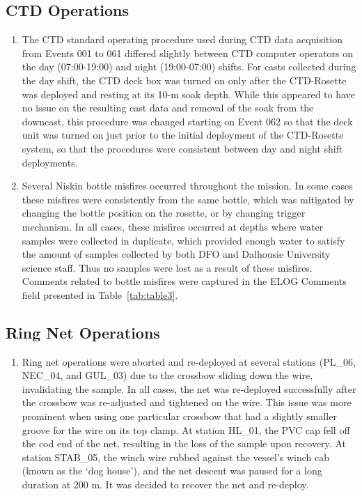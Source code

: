 \documentclass[12pt]{article}\usepackage[]{graphicx}\usepackage[]{color}
\begin{document}
\subsection{CTD Operations}\label{ctd-operations-1}
\begin{enumerate}
\def\labelenumi{\arabic{enumi}.}
\item
  The CTD standard operating procedure used during CTD data acquisition from Events 001 to 061 differed slightly between CTD computer operators on the day (07:00-19:00) and night (19:00-07:00) shifts. For casts collected during the day shift, the CTD deck box was turned on only after the CTD-Rosette was deployed and resting at its 10-m soak depth. While this appeared to have no issue on the resulting cast data and removal of the soak from the downcast, this procedure was changed starting on Event 062 so that the deck unit was turned on just prior to the initial deployment of the CTD-Rosette system, so that the procedures were consistent between day and night shift deployments.
\item
  Several Niskin bottle misfires occurred throughout the mission. In some cases these misfires were consistently from the same bottle, which was mitigated by changing the bottle position on the rosette, or by changing trigger mechanism. In all cases, these misfires occurred at depths where water samples were collected in duplicate, which provided enough water to satisfy the amount of samples collected by both DFO and Dalhousie University science staff. Thus no samples were lost as a result of these misfires. Comments related to bottle misfires were captured in the ELOG Comments field presented in Table~\ref{tab:table3}.
\end{enumerate}
\subsection{Ring Net Operations}\label{ring-net-operations}
\begin{enumerate}
\def\labelenumi{\arabic{enumi}.}

\item
  Ring net operations were aborted and re-deployed at several stations (PL\_06, NEC\_04, and GUL\_03) due to the crossbow sliding down the wire, invalidating the sample. In all cases, the net was re-deployed successfully after the crossbow was re-adjusted and tightened on the wire. This issue was more prominent when using one particular crossbow that had a slightly smaller groove for the wire on its top clamp. At station HL\_01, the PVC cap fell off the cod end of the net, resulting in the loss of the sample upon recovery. At station STAB\_05, the winch wire rubbed against the vessel's winch cab (known as the `dog house'), and the net descent was paused for a long duration at 200 m. It was decided to recover the net and re-deploy.
\end{enumerate}
\end{document}

